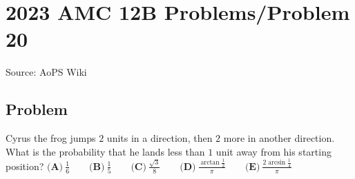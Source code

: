 \documentclass[12pt]{article}
\begin{document}
\section*{{2023 AMC 12B Problems/Problem 20}}
Source: AoPS Wiki

\subsection*{Problem}
Cyrus the frog jumps $2$ units in a direction, then $2$ more in another direction. What is the probability that he lands less than $1$ unit away from his starting position? $\textbf{(A)}~\frac{1}{6}\qquad\textbf{(B)}~\frac{1}{5}\qquad\textbf{(C)}~\frac{\sqrt{3}}{8}\qquad\textbf{(D)}~\frac{\arctan \frac{1}{2}}{\pi}\qquad\textbf{(E)}~\frac{2\arcsin \frac{1}{4}}{\pi}$
\end{document}
